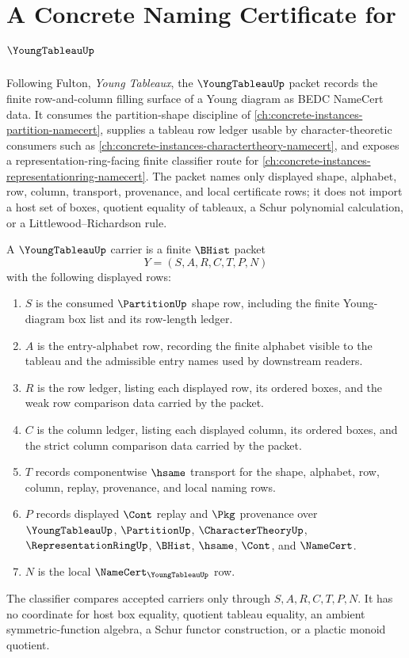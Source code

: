 \chapter{A Concrete Naming Certificate for $\YoungTableauUp$}
\label{ch:concrete-instances-young-tableau-namecert}

Following Fulton, \emph{Young Tableaux}, the $\YoungTableauUp$ packet records the finite row-and-column filling surface of a Young diagram as BEDC NameCert data. It consumes the partition-shape discipline of \autoref{ch:concrete-instances-partition-namecert}, supplies a tableau row ledger usable by character-theoretic consumers such as \autoref{ch:concrete-instances-charactertheory-namecert}, and exposes a representation-ring-facing finite classifier route for \autoref{ch:concrete-instances-representationring-namecert}. The packet names only displayed shape, alphabet, row, column, transport, provenance, and local certificate rows; it does not import a host set of boxes, quotient equality of tableaux, a Schur polynomial calculation, or a Littlewood--Richardson rule.

\begin{definition}
\label{def:young-tableau-carrier}
A $\YoungTableauUp$ carrier is a finite $\BHist$ packet
$$
Y=(S,A,R,C,T,P,N)
$$
with the following displayed rows:
\begin{enumerate}
\item $S$ is the consumed $\PartitionUp$ shape row, including the finite Young-diagram box list and its row-length ledger.
\item $A$ is the entry-alphabet row, recording the finite alphabet visible to the tableau and the admissible entry names used by downstream readers.
\item $R$ is the row ledger, listing each displayed row, its ordered boxes, and the weak row comparison data carried by the packet.
\item $C$ is the column ledger, listing each displayed column, its ordered boxes, and the strict column comparison data carried by the packet.
\item $T$ records componentwise $\hsame$ transport for the shape, alphabet, row, column, replay, provenance, and local naming rows.
\item $P$ records displayed $\Cont$ replay and $\Pkg$ provenance over $\YoungTableauUp$, $\PartitionUp$, $\CharacterTheoryUp$, $\RepresentationRingUp$, $\BHist$, $\hsame$, $\Cont$, and $\NameCert$.
\item $N$ is the local $\NameCert_{\YoungTableauUp}$ row.
\end{enumerate}
The classifier compares accepted carriers only through $S,A,R,C,T,P,N$. It has no coordinate for host box equality, quotient tableau equality, an ambient symmetric-function algebra, a Schur functor construction, or a plactic monoid quotient.
\end{definition}

